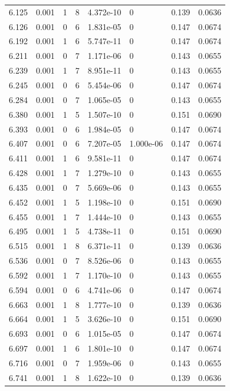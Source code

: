\documentclass[preview]{standalone}
\begin{document}
{{{{{{\begin{tabular}{L{1.2cm}C{1.2cm} C{0.3cm}C{0.5cm} C{1.4cm}C{1.4cm} C{1.4cm}C{1.4cm}}
  6.125  &  0.001  & 1     &  8 &  4.372e-10  & 0  & 0.139 &  0.0636   \\ 
  6.126  &  0.001  & 0     &  6 &  1.831e-05  & 0  & 0.147 &  0.0674   \\ 
  6.192  &  0.001  & 1     &  6 &  5.747e-11  & 0  & 0.147 &  0.0674   \\ 
  6.211  &  0.001  & 0     &  7 &  1.171e-06  & 0  & 0.143 &  0.0655   \\ 
  6.239  &  0.001  & 1     &  7 &  8.951e-11  & 0  & 0.143 &  0.0655   \\ 
  6.245  &  0.001  & 0     &  6 &  5.454e-06  & 0  & 0.147 &  0.0674   \\ 
  6.284  &  0.001  & 0     &  7 &  1.065e-05  & 0  & 0.143 &  0.0655   \\ 
  6.380  &  0.001  & 1     &  5 &  1.507e-10  & 0  & 0.151 &  0.0690   \\ 
  6.393  &  0.001  & 0     &  6 &  1.984e-05  & 0  & 0.147 &  0.0674   \\ 
  6.407  &  0.001  & 0     &  6 &  7.207e-05  & 1.000e-06  & 0.147 &  0.0674   \\ 
  6.411  &  0.001  & 1     &  6 &  9.581e-11  & 0  & 0.147 &  0.0674   \\ 
  6.428  &  0.001  & 1     &  7 &  1.279e-10  & 0  & 0.143 &  0.0655   \\ 
  6.435  &  0.001  & 0     &  7 &  5.669e-06  & 0  & 0.143 &  0.0655   \\ 
  6.452  &  0.001  & 1     &  5 &  1.198e-10  & 0  & 0.151 &  0.0690   \\ 
  6.455  &  0.001  & 1     &  7 &  1.444e-10  & 0  & 0.143 &  0.0655   \\ 
  6.495  &  0.001  & 1     &  5 &  4.738e-11  & 0  & 0.151 &  0.0690   \\ 
  6.515  &  0.001  & 1     &  8 &  6.371e-11  & 0  & 0.139 &  0.0636   \\ 
  6.536  &  0.001  & 0     &  7 &  8.526e-06  & 0  & 0.143 &  0.0655   \\ 
  6.592  &  0.001  & 1     &  7 &  1.170e-10  & 0  & 0.143 &  0.0655   \\ 
  6.594  &  0.001  & 0     &  6 &  4.741e-06  & 0  & 0.147 &  0.0674   \\ 
  6.663  &  0.001  & 1     &  8 &  1.777e-10  & 0  & 0.139 &  0.0636   \\ 
  6.664  &  0.001  & 1     &  5 &  3.626e-10  & 0  & 0.151 &  0.0690   \\ 
  6.693  &  0.001  & 0     &  6 &  1.015e-05  & 0  & 0.147 &  0.0674   \\ 
  6.697  &  0.001  & 1     &  6 &  1.801e-10  & 0  & 0.147 &  0.0674   \\ 
  6.716  &  0.001  & 0     &  7 &  1.959e-06  & 0  & 0.143 &  0.0655   \\ 
  6.741  &  0.001  & 1     &  8 &  1.622e-10  & 0  & 0.139 &  0.0636   \\ 
\hline 
\end{tabular} 

}}}}}}
\end{document}
